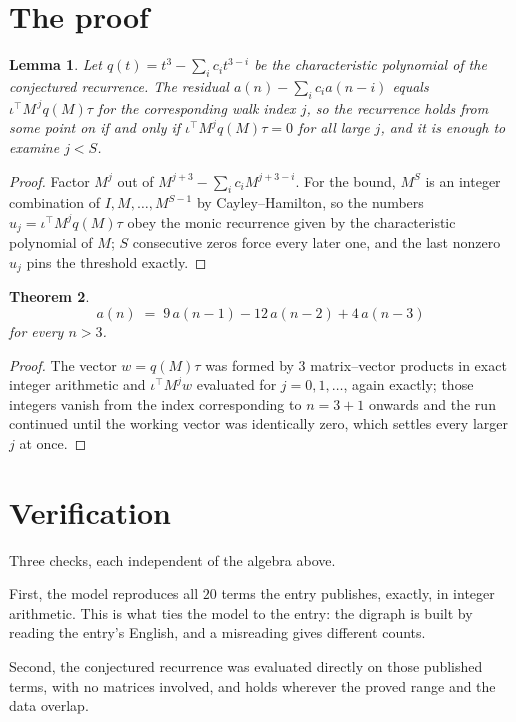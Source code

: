 \documentclass[11pt,a4paper]{article}
\theoremstyle{plain}
\newtheorem{theorem}{Theorem}
\newtheorem{lemma}[theorem]{Lemma}
\theoremstyle{definition}
\begin{document}
\section{The proof}

\begin{lemma}\label{lem:crit}
Let $q(t)=t^{3}-\sum_i c_it^{3-i}$ be the characteristic polynomial of the
conjectured recurrence. The residual $a(n)-\sum_ic_ia(n-i)$ equals
$\iota^{\!\top}M^{\,j}q(M)\tau$ for the corresponding walk index $j$, so the recurrence
holds from some point on if and only if $\iota^{\!\top}M^{j}q(M)\tau=0$ for all large $j$,
and it is enough to examine $j<S$.
\end{lemma}

\begin{proof}
Factor $M^{j}$ out of $M^{j+3}-\sum_ic_iM^{j+3-i}$. For the bound, $M^{S}$
is an integer combination of $I,M,\dots,M^{S-1}$ by Cayley--Hamilton, so the numbers
$u_j=\iota^{\!\top}M^{j}q(M)\tau$ obey the monic recurrence given by the characteristic
polynomial of $M$; $S$ consecutive zeros force every later one, and the last nonzero $u_j$
pins the threshold exactly.
\end{proof}

\begin{theorem}
\[
a(n)\;=\;9\,a(n-1) - 12\,a(n-2) + 4\,a(n-3)
\]
for every $n>3$.
\end{theorem}

\begin{proof}
The vector $w=q(M)\tau$ was formed by $3$ matrix--vector products in exact integer
arithmetic and $\iota^{\!\top}M^{j}w$ evaluated for $j=0,1,\dots$, again exactly; those
integers vanish from the index corresponding to $n=3+1$ onwards and the run continued
until the working vector was identically zero, which settles every larger $j$ at once.
\end{proof}

\section{Verification}

Three checks, each independent of the algebra above.

First, the model reproduces all $20$ terms the entry publishes, exactly, in integer
arithmetic. This is what ties the model to the entry: the digraph is built by reading the
entry's English, and a misreading gives different counts.

Second, the conjectured recurrence was evaluated directly on those published terms, with no
matrices involved, and holds wherever the proved range and the data overlap.
\end{document}
